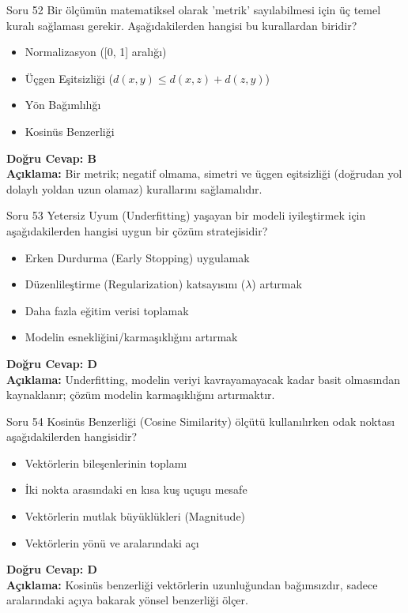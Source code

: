 \documentclass[12pt,a4paper]{article}
\begin{document}
\begin{testcard}{Soru 52}
    Bir ölçümün matematiksel olarak 'metrik' sayılabilmesi için üç temel kuralı sağlaması gerekir. Aşağıdakilerden hangisi bu kurallardan biridir?
    \begin{itemize}
        \item[A)] Normalizasyon ([0, 1] aralığı)
        \item[B)] Üçgen Eşitsizliği ($d(x, y) \leq d(x, z) + d(z, y)$)
        \item[C)] Yön Bağımlılığı
        \item[D)] Kosinüs Benzerliği
    \end{itemize}
    \tcblower
    \textbf{Doğru Cevap: B} \\
    \textbf{Açıklama:} Bir metrik; negatif olmama, simetri ve üçgen eşitsizliği (doğrudan yol dolaylı yoldan uzun olamaz) kurallarını sağlamalıdır.
\end{testcard}

\begin{testcard}{Soru 53}
    Yetersiz Uyum (Underfitting) yaşayan bir modeli iyileştirmek için aşağıdakilerden hangisi uygun bir çözüm stratejisidir?
    \begin{itemize}
        \item[A)] Erken Durdurma (Early Stopping) uygulamak
        \item[B)] Düzenlileştirme (Regularization) katsayısını ($\lambda$) artırmak
        \item[C)] Daha fazla eğitim verisi toplamak
        \item[D)] Modelin esnekliğini/karmaşıklığını artırmak
    \end{itemize}
    \tcblower
    \textbf{Doğru Cevap: D} \\
    \textbf{Açıklama:} Underfitting, modelin veriyi kavrayamayacak kadar basit olmasından kaynaklanır; çözüm modelin karmaşıklığını artırmaktır.
\end{testcard}

\begin{testcard}{Soru 54}
    Kosinüs Benzerliği (Cosine Similarity) ölçütü kullanılırken odak noktası aşağıdakilerden hangisidir?
    \begin{itemize}
        \item[A)] Vektörlerin bileşenlerinin toplamı
        \item[B)] İki nokta arasındaki en kısa kuş uçuşu mesafe
        \item[C)] Vektörlerin mutlak büyüklükleri (Magnitude)
        \item[D)] Vektörlerin yönü ve aralarındaki açı
    \end{itemize}
    \tcblower
    \textbf{Doğru Cevap: D} \\
    \textbf{Açıklama:} Kosinüs benzerliği vektörlerin uzunluğundan bağımsızdır, sadece aralarındaki açıya bakarak yönsel benzerliği ölçer.
\end{testcard}
\end{document}
